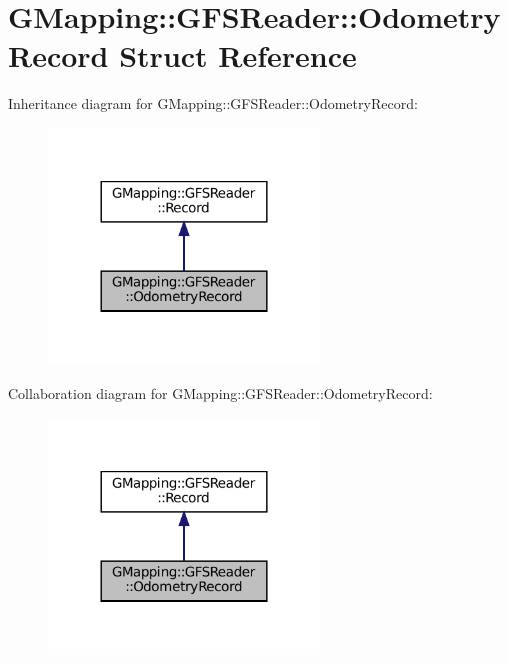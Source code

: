 \hypertarget{structGMapping_1_1GFSReader_1_1OdometryRecord}{}\section{G\+Mapping\+:\+:G\+F\+S\+Reader\+:\+:Odometry\+Record Struct Reference}
\label{structGMapping_1_1GFSReader_1_1OdometryRecord}


Inheritance diagram for G\+Mapping\+:\+:G\+F\+S\+Reader\+:\+:Odometry\+Record\+:
\nopagebreak
\begin{figure}[H]
\begin{center}
\leavevmode
\includegraphics[width=204pt]{structGMapping_1_1GFSReader_1_1OdometryRecord__inherit__graph}
\end{center}
\end{figure}


Collaboration diagram for G\+Mapping\+:\+:G\+F\+S\+Reader\+:\+:Odometry\+Record\+:
\nopagebreak
\begin{figure}[H]
\begin{center}
\leavevmode
\includegraphics[width=204pt]{structGMapping_1_1GFSReader_1_1OdometryRecord__coll__graph}
\end{center}
\end{figure}
